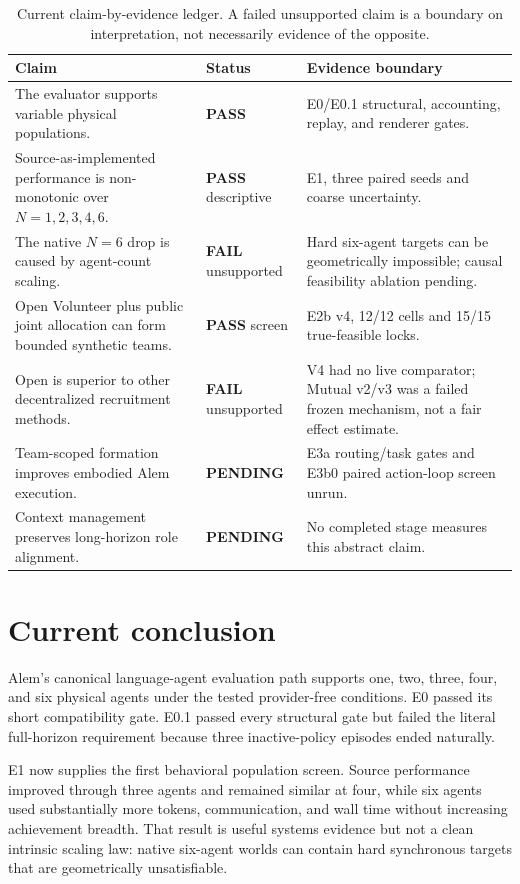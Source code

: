 \documentclass[11pt]{article}
\newcommand{\pass}{\textcolor{passgreen}{\textbf{PASS}}}
\newcommand{\fail}{\textcolor{failred}{\textbf{FAIL}}}
\newcommand{\pending}{\textcolor{pendingblue}{\textbf{PENDING}}}
\begin{document}
\begin{table}[ht]
\centering
\small
\begin{tabularx}{\textwidth}{@{}X l X@{}}
\toprule
Claim & Status & Evidence boundary\\
\midrule
The evaluator supports variable physical populations. & \pass &
E0/E0.1 structural, accounting, replay, and renderer gates.\\
Source-as-implemented performance is non-monotonic over $N=1,2,3,4,6$. &
\pass{} descriptive & E1, three paired seeds and coarse uncertainty.\\
The native $N=6$ drop is caused by agent-count scaling. & \fail{} unsupported &
Hard six-agent targets can be geometrically impossible; causal feasibility
ablation pending.\\
Open Volunteer plus public joint allocation can form bounded synthetic teams. &
\pass{} screen & E2b v4, 12/12 cells and 15/15 true-feasible locks.\\
Open is superior to other decentralized recruitment methods. &
\fail{} unsupported & V4 had no live comparator; Mutual v2/v3 was a failed
frozen mechanism, not a fair effect estimate.\\
Team-scoped formation improves embodied Alem execution. & \pending &
E3a routing/task gates and E3b0 paired action-loop screen unrun.\\
Context management preserves long-horizon role alignment. & \pending &
No completed stage measures this abstract claim.\\
\bottomrule
\end{tabularx}
\caption{Current claim-by-evidence ledger.  A failed unsupported claim is a
boundary on interpretation, not necessarily evidence of the opposite.}
\label{tab:claim-ledger}
\end{table}

\section{Current conclusion}

Alem's canonical language-agent evaluation path supports one, two, three,
four, and six physical agents under the tested provider-free conditions.  E0
passed its short compatibility gate.  E0.1 passed every structural gate but
failed the literal full-horizon requirement because three inactive-policy
episodes ended naturally.

E1 now supplies the first behavioral population screen.  Source performance
improved through three agents and remained similar at four, while six agents
used substantially more tokens, communication, and wall time without
increasing achievement breadth.  That result is useful systems evidence but
not a clean intrinsic scaling law: native six-agent worlds can contain hard
synchronous targets that are geometrically unsatisfiable.
\end{document}
